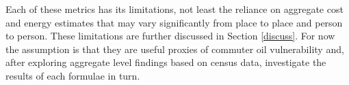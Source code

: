 Each of these metrics has its limitations, not least the reliance on aggregate
cost and energy estimates that may vary significantly from place to place and
person to person. These limitations are further discussed in Section
\ref{discuss}.
For now the assumption is that they are useful proxies of commuter
oil vulnerability and, after exploring aggregate level
findings based on census data, investigate the results of each formulae in turn.

% 

